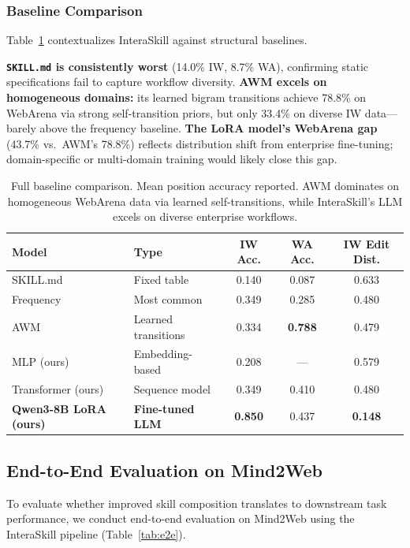 \documentclass{article}
\begin{document}
\subsubsection{Baseline Comparison}

Table~\ref{tab:baselines} contextualizes InteraSkill against structural baselines.

\textbf{\texttt{SKILL.md} is consistently worst} (14.0\% IW, 8.7\% WA), confirming static specifications fail to capture workflow diversity. \textbf{AWM excels on homogeneous domains:} its learned bigram transitions achieve 78.8\% on WebArena via strong self-transition priors, but only 33.4\% on diverse IW data---barely above the frequency baseline. \textbf{The LoRA model's WebArena gap} (43.7\% vs.\ AWM's 78.8\%) reflects distribution shift from enterprise fine-tuning; domain-specific or multi-domain training would likely close this gap.

\begin{table}[h]
\centering
\caption{Full baseline comparison. Mean position accuracy reported. AWM dominates on homogeneous WebArena data via learned self-transitions, while InteraSkill's LLM excels on diverse enterprise workflows.}
\label{tab:baselines}
\small
\begin{tabular}{llccc}
\toprule
\textbf{Model} & \textbf{Type} & \textbf{IW Acc.} & \textbf{WA Acc.} & \textbf{IW Edit Dist.} \\
\midrule
SKILL.md & Fixed table & 0.140 & 0.087 & 0.633 \\
Frequency & Most common & 0.349 & 0.285 & 0.480 \\
AWM~\cite{wang2024awm} & Learned transitions & 0.334 & \textbf{0.788} & 0.479 \\
\midrule
MLP (ours) & Embedding-based & 0.208 & --- & 0.579 \\
Transformer (ours) & Sequence model & 0.349 & 0.410 & 0.480 \\
\textbf{Qwen3-8B LoRA (ours)} & \textbf{Fine-tuned LLM} & \textbf{0.850} & 0.437 & \textbf{0.148} \\
\bottomrule
\end{tabular}
\end{table}

\subsection{End-to-End Evaluation on Mind2Web}
\label{sec:results_e2e}

To evaluate whether improved skill composition translates to downstream task performance, we conduct end-to-end evaluation on Mind2Web using the InteraSkill pipeline (Table~\ref{tab:e2e}).
\end{document}
